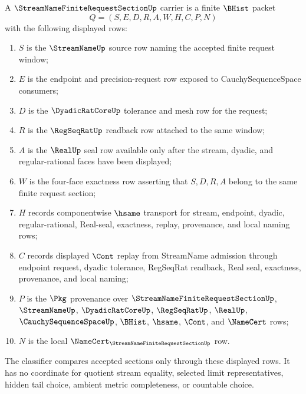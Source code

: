 \begin{definition}
\label{def:streamname-finite-request-section-carrier}
A $\StreamNameFiniteRequestSectionUp$ carrier is a finite $\BHist$ packet
$$
Q=(S,E,D,R,A,W,H,C,P,N)
$$
with the following displayed rows:
\begin{enumerate}
\item $S$ is the $\StreamNameUp$ source row naming the accepted finite request window;
\item $E$ is the endpoint and precision-request row exposed to CauchySequenceSpace consumers;
\item $D$ is the $\DyadicRatCoreUp$ tolerance and mesh row for the request;
\item $R$ is the $\RegSeqRatUp$ readback row attached to the same window;
\item $A$ is the $\RealUp$ seal row available only after the stream, dyadic, and regular-rational faces have been displayed;
\item $W$ is the four-face exactness row asserting that $S,D,R,A$ belong to the same finite request section;
\item $H$ records componentwise $\hsame$ transport for stream, endpoint, dyadic, regular-rational, Real-seal, exactness, replay, provenance, and local naming rows;
\item $C$ records displayed $\Cont$ replay from StreamName admission through endpoint request, dyadic tolerance, RegSeqRat readback, Real seal, exactness, provenance, and local naming;
\item $P$ is the $\Pkg$ provenance over $\StreamNameFiniteRequestSectionUp$, $\StreamNameUp$, $\DyadicRatCoreUp$, $\RegSeqRatUp$, $\RealUp$, $\CauchySequenceSpaceUp$, $\BHist$, $\hsame$, $\Cont$, and $\NameCert$ rows;
\item $N$ is the local $\NameCert_{\StreamNameFiniteRequestSectionUp}$ row.
\end{enumerate}
The classifier compares accepted sections only through these displayed rows. It has no coordinate for quotient stream equality, selected limit representatives, hidden tail choice, ambient metric completeness, or countable choice.
\end{definition}

